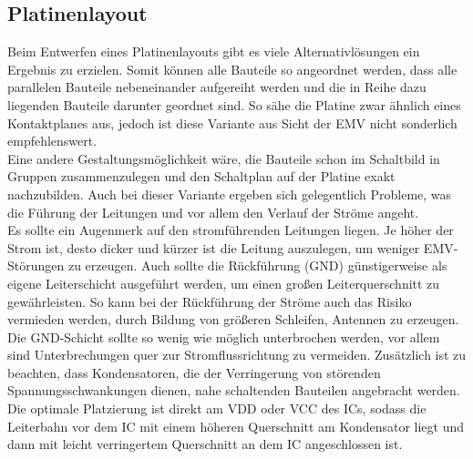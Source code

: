 \subsection{Platinenlayout}
Beim Entwerfen eines Platinenlayouts gibt es viele Alternativlösungen ein Ergebnis zu erzielen. Somit können alle Bauteile so angeordnet werden, dass alle parallelen Bauteile nebeneinander aufgereiht werden und die in Reihe dazu liegenden Bauteile darunter geordnet sind. So sähe die Platine zwar ähnlich eines Kontaktplanes aus, jedoch ist diese Variante aus Sicht der EMV nicht sonderlich empfehlenswert.\\
Eine andere Gestaltungsmöglichkeit wäre, die Bauteile schon im Schaltbild in Gruppen zusammenzulegen und den Schaltplan auf der Platine exakt nachzubilden. Auch bei dieser Variante ergeben sich gelegentlich Probleme, was die Führung der Leitungen und vor allem den Verlauf der Ströme angeht.\\
Es sollte ein Augenmerk auf den stromführenden Leitungen liegen. Je höher der Strom ist, desto dicker und kürzer ist die Leitung auszulegen, um weniger EMV-Störungen zu erzeugen. Auch sollte die Rückführung (GND) günstigerweise als eigene Leiterschicht ausgeführt werden, um einen großen Leiterquerschnitt zu gewährleisten. So kann bei der Rückführung der Ströme auch das Risiko vermieden werden, durch Bildung von größeren Schleifen, Antennen zu erzeugen. Die GND-Schicht sollte so wenig wie möglich unterbrochen werden, vor allem sind Unterbrechungen quer zur Stromflussrichtung zu vermeiden. Zusätzlich ist zu beachten, dass Kondensatoren, die der Verringerung von störenden Spannungsschwankungen dienen, nahe schaltenden Bauteilen angebracht werden. Die optimale Platzierung ist direkt am VDD oder VCC des ICs, sodass die Leiterbahn vor dem IC mit einem höheren Querschnitt am Kondensator liegt und dann mit leicht verringertem Querschnitt an dem IC angeschlossen ist.



